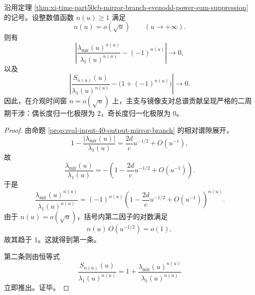 \begin{corollary}[介观长度上的严格二周期干涉律]\label{cor:xi-time-part50cb-mesoscopic-period2-interference}
沿用定理 \ref{thm:xi-time-part50cb-mirror-branch-evenodd-power-sum-suppression} 的记号。设整数值函数 \(n(u)\ge 1\) 满足
\[
n(u)=o(\sqrt u)
\qquad (u\to+\infty).
\]
则有
\[
\left|
\frac{\lambda_{\mathrm{mir}}(u)^{n(u)}}{\lambda_1(u)^{n(u)}}-(-1)^{n(u)}
\right|
\longrightarrow 0,
\]
以及
\[
\left|
\frac{S_{n(u)}(u)}{\lambda_1(u)^{n(u)}}-\bigl(1+(-1)^{n(u)}\bigr)
\right|
\longrightarrow 0.
\]
因此，在介观时间窗 \(n=o(\sqrt u)\) 上，主支与镜像支对总谱贡献呈现严格的二周期干涉：偶长度归一化极限为 \(2\)，奇长度归一化极限为 \(0\)。
\end{corollary}
\begin{proof}
由命题 \ref{prop:real-input-40-output-mirror-branch} 的相对谱隙展开，
\[
1-\frac{|\lambda_{\mathrm{mir}}(u)|}{\lambda_1(u)}
=
\frac{2d}{c}u^{-1/2}+O(u^{-1}),
\]
故
\[
\frac{\lambda_{\mathrm{mir}}(u)}{\lambda_1(u)}
=
-\left(1-\frac{2d}{c}u^{-1/2}+O(u^{-1})\right).
\]
于是
\[
\frac{\lambda_{\mathrm{mir}}(u)^{n(u)}}{\lambda_1(u)^{n(u)}}
=
(-1)^{n(u)}
\left(1-\frac{2d}{c}u^{-1/2}+O(u^{-1})\right)^{n(u)}.
\]
由于 \(n(u)=o(\sqrt u)\)，括号内第二因子的对数满足
\[
n(u)\,O(u^{-1/2})=o(1),
\]
故其趋于 \(1\)。这就得到第一条。

第二条则由恒等式
\[
\frac{S_{n(u)}(u)}{\lambda_1(u)^{n(u)}}
=
1+\frac{\lambda_{\mathrm{mir}}(u)^{n(u)}}{\lambda_1(u)^{n(u)}}
\]
立即推出。证毕。
\end{proof}

\endinput

